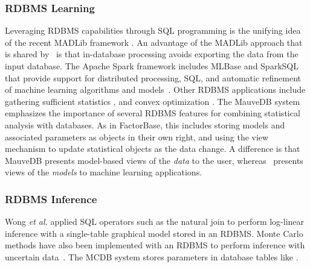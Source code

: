 \documentclass{IEEEtran}
\begin{document}
\subsubsection{RDBMS Learning}
Leveraging RDBMS capabilities through SQL programming 
is the unifying idea of the recent MADLib framework \cite{MADlib_VLDB_2012}. An advantage of the MADLib approach that is shared by \FB\ is that in-database processing avoids exporting the data from the input database. The Apache Spark \cite{Committers} framework includes MLBase and SparkSQL that provide support for distributed processing, SQL, and automatic refinement of machine learning algorithms and models~\cite{MLbase_ICDR_2013}.
Other RDBMS applications include gathering sufficient statistics \cite{Graefe1998}, and convex optimization \cite{Feng_SIGMOD_2012}. The MauveDB system \cite{Deshpande2006} emphasizes the importance of several RDBMS features for combining statistical analysis with databases.
As in {\sc FactorBase}, this includes 
storing models and associated parameters as objects in their own right, 
and using the view mechanism to update statistical objects as the data change.
A difference is that
MauveDB presents model-based views of the {\em data} to the user, whereas \FB\ presents views of the {\em models} to machine learning applications. 

\subsubsection{RDBMS Inference}
Wong {\em et al.}  applied SQL operators such as the natural join to perform log-linear inference with a single-table graphical model \cite{Wong1995} stored in an RDBMS. 
Monte Carlo methods have also been implemented with an RDBMS  to perform inference with uncertain data~\cite{MCDB_SIGMOD_2008,Wick_VLDB_2010}.
The MCDB system \cite{MCDB_SIGMOD_2008}  stores parameters in database tables like \FB. 
%
\end{document}
